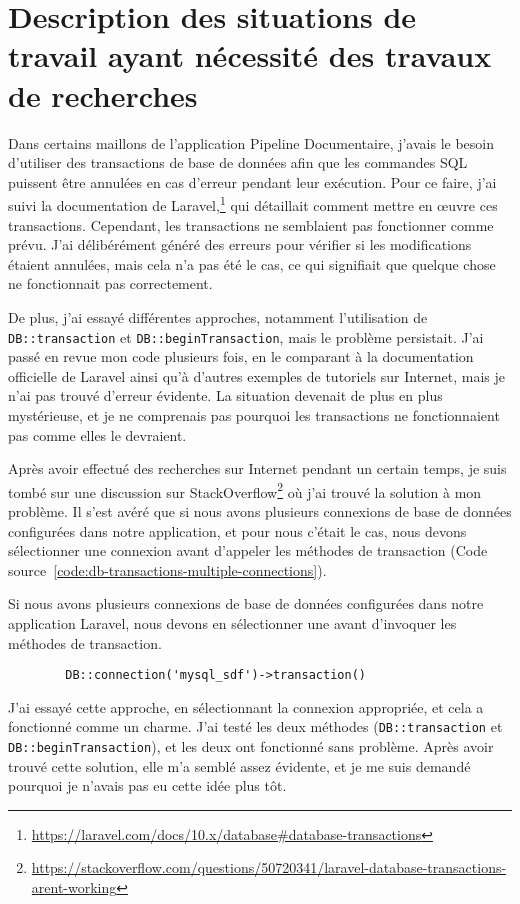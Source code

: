 \chapter{Description des situations de travail ayant nécessité des travaux de recherches}\label{ch:recherche}

Dans certains maillons de l'application Pipeline Documentaire, j'avais le besoin d'utiliser des transactions de base de données afin que les commandes SQL puissent être annulées en cas d'erreur pendant leur exécution. Pour ce faire, j'ai suivi la documentation de Laravel,\cprotect\footnote{\url{https://laravel.com/docs/10.x/database#database-transactions}} qui détaillait comment mettre en œuvre ces transactions. Cependant, les transactions ne semblaient pas fonctionner comme prévu. J'ai délibérément généré des erreurs pour vérifier si les modifications étaient annulées, mais cela n'a pas été le cas, ce qui signifiait que quelque chose ne fonctionnait pas correctement.

De plus, j'ai essayé différentes approches, notamment l'utilisation de \Verb|DB::transaction| et \Verb|DB::beginTransaction|, mais le problème persistait. J'ai passé en revue mon code plusieurs fois, en le comparant à la documentation officielle de Laravel ainsi qu'à d'autres exemples de tutoriels sur Internet, mais je n'ai pas trouvé d'erreur évidente. La situation devenait de plus en plus mystérieuse, et je ne comprenais pas pourquoi les transactions ne fonctionnaient pas comme elles le devraient.

Après avoir effectué des recherches sur Internet pendant un certain temps, je suis tombé sur une discussion sur StackOverflow\footnote{\url{https://stackoverflow.com/questions/50720341/laravel-database-transactions-arent-working}} où j'ai trouvé la solution à mon problème. Il s'est avéré que si nous avons plusieurs connexions de base de données configurées dans notre application, et pour nous c'était le cas, nous devons sélectionner une connexion avant d'appeler les méthodes de transaction (Code source~\ref{code:db-transactions-multiple-connections}).

\begin{code}
    \caption{Si nous avons plusieurs connexions de base de données configurées dans notre application Laravel, nous devons en sélectionner une avant d'invoquer les méthodes de transaction.}
    \begin{verbatim}
        DB::connection('mysql_sdf')->transaction()
    \end{verbatim}
    \label{code:db-transactions-multiple-connections}
\end{code}

J'ai essayé cette approche, en sélectionnant la connexion appropriée, et cela a fonctionné comme un charme. J'ai testé les deux méthodes (\Verb|DB::transaction| et \Verb|DB::beginTransaction|), et les deux ont fonctionné sans problème. Après avoir trouvé cette solution, elle m'a semblé assez évidente, et je me suis demandé pourquoi je n'avais pas eu cette idée plus tôt.